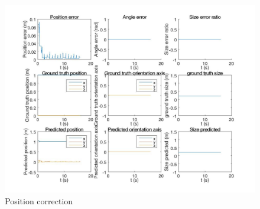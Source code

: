 \begin{figure}
  \includegraphics[width=1.2\textwidth,trim = 0mm 0mm 0mm 0mm,clip]{./Figures/observer_error_stationary_position.jpg}
  \caption{Position correction}
\end{figure}

	
